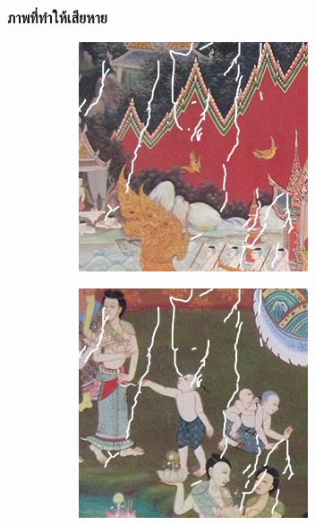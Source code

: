 \documentclass[xcolor=dvipsnames, xetex,serif]{beamer}
\numberwithin{equation}{section}
\begin{document}
		\begin{frame}
			\frametitle{ภาพที่ทำให้เสียหาย}
			\begin{figure}[H]
				\centering
				\begin{subfigure}{0.3\linewidth}
					\centering
					\includegraphics[width=0.7\linewidth]{images/thaiart/case01-toinpaint.png}
				\end{subfigure}
				\begin{subfigure}{0.3\linewidth}
					\centering
					\includegraphics[width=0.7\linewidth]{images/thaiart/case02-toinpaint.png}
				\end{subfigure}
				\vspace{1cm}
				\begin{subfigure}{0.3\linewidth}
					\centering

\end{subfigure}
\end{figure}
\end{frame}
\end{document}
